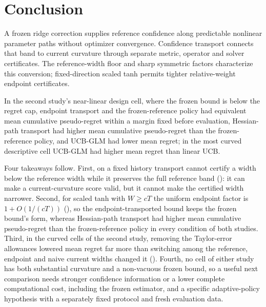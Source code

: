 \section{Conclusion}\label{sec:conclusion}

A frozen ridge correction supplies reference confidence along predictable
nonlinear parameter paths without optimizer convergence. Confidence transport
connects that band to current curvature through separate metric, operator and
solver certificates. The reference-width floor and sharp symmetric factors
characterize this conversion; fixed-direction scaled tanh permits tighter
relative-weight endpoint certificates.

In the second study's near-linear design cell, where the frozen bound is below
the regret cap, endpoint transport and the frozen-reference policy had
equivalent mean cumulative pseudo-regret within a margin fixed before
evaluation, Hessian-path transport had higher mean cumulative pseudo-regret
than the frozen-reference policy, and UCB-GLM had lower mean regret; in the
most curved descriptive cell UCB-GLM had higher mean regret than linear UCB.

Four takeaways follow. First, on a fixed history transport cannot certify a
width below the reference width while it preserves the full reference band
(): it can make a current-curvature score
valid, but it cannot make the certified width narrower. Second, for scaled tanh
with $W\ge cT$ the uniform endpoint factor is $1+O(1/(cT))$
(), so the endpoint-transported bound keeps the
frozen bound's form, whereas Hessian-path transport had higher mean cumulative
pseudo-regret than the frozen-reference policy in every condition of both
studies. Third, in the curved cells of the second study, removing the
Taylor-error allowances lowered mean regret far more than switching among the
reference, endpoint and naive current widths changed it
(). Fourth, no cell of either study has both
substantial curvature and a non-vacuous frozen bound, so a useful next
comparison needs stronger confidence information or a lower complete
computational cost, including the frozen estimator, and a specific
adaptive-policy hypothesis with a separately fixed protocol and fresh
evaluation data.
